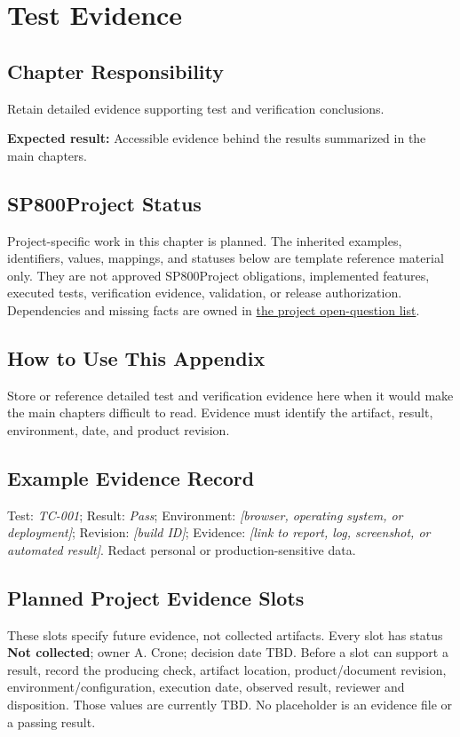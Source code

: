 \chapter{Test Evidence}
\section{Chapter Responsibility}
\label{Section:TestEvidenceResponsibility}
Retain detailed evidence supporting test and verification conclusions.

\noindent\textbf{Expected result:} Accessible evidence behind the results summarized in the main chapters.

\section{SP800Project Status}
\label{Section:SP800StatusTestEvidence}
Project-specific work in this chapter is planned. The inherited examples,
identifiers, values, mappings, and statuses below are template reference
material only. They are not approved SP800Project obligations, implemented features,
executed tests, verification evidence, validation, or release authorization.
Dependencies and missing facts are owned in
\hyperref[Section:SP800OpenQuestions]{the project open-question list}.

\section{How to Use This Appendix}
Store or reference detailed test and verification evidence here when it would make the main chapters difficult to read. Evidence must identify the artifact, result, environment, date, and product revision.
\section{Example Evidence Record}
Test: \textit{TC-001}; Result: \textit{Pass}; Environment: \textit{[browser, operating system, or deployment]}; Revision: \textit{[build ID]}; Evidence: \textit{[link to report, log, screenshot, or automated result]}. Redact personal or production-sensitive data.
\section{Planned Project Evidence Slots}\label{Section:PlannedProjectEvidence}
These slots specify future evidence, not collected artifacts. Every slot has
status \textbf{Not collected}; owner A. Crone; decision date TBD.
Before a slot can support a result, record the producing check, artifact
location, product/document revision, environment/configuration, execution date,
observed result, reviewer and disposition. Those values are currently TBD.
No placeholder is an evidence file or a passing result.

